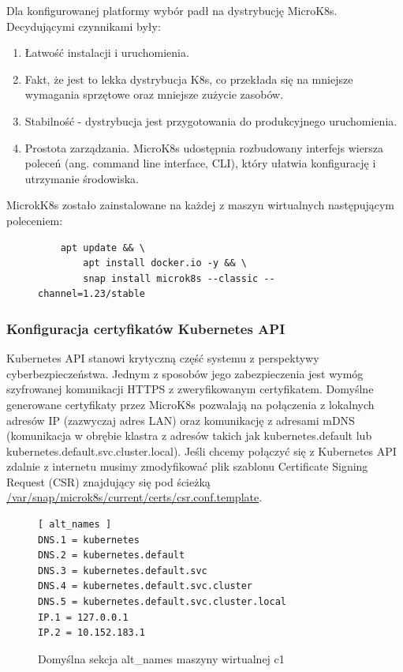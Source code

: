 \begin{samepage}
    Dla konfigurowanej platformy wybór padł na dystrybucję MicroK8s\cite{microk8s-docs-home}.
    Decydującymi czynnikami były:
    \begin{enumerate}
        \item Łatwość instalacji i uruchomienia.
        \item Fakt, że jest to lekka dystrybucja K8s, co przekłada się na mniejsze wymagania sprzętowe oraz mniejsze zużycie zasobów.
        \item Stabilność - dystrybucja jest przygotowania do produkcyjnego uruchomienia.
        \item Prostota zarządzania. MicroK8s udostępnia rozbudowany interfejs wiersza poleceń (ang. command line interface, CLI), który ułatwia konfigurację i utrzymanie środowiska.
    \end{enumerate}
\end{samepage}

MicrokK8s zostało zainstalowane na każdej z maszyn wirtualnych następującym poleceniem:
\begin{figure}[H]
    \begin{verbatim}
    apt update && \
        apt install docker.io -y && \
        snap install microk8s --classic --channel=1.23/stable
    \end{verbatim}
    \label{fig:install-microk8s}
\end{figure}

\subsubsection{Konfiguracja certyfikatów Kubernetes API}

Kubernetes API stanowi krytyczną część systemu z perspektywy cyberbezpieczeństwa.
Jednym z sposobów jego zabezpieczenia jest wymóg szyfrowanej komunikacji HTTPS z zweryfikowanym certyfikatem.
Domyślne generowane certyfikaty przez MicroK8s pozwalają na połączenia z lokalnych adresów IP (zazwyczaj adres LAN) oraz komunikację z adresami mDNS (komunikacja w obrębie klastra z adresów takich jak kubernetes.default lub kubernetes.default.svc.cluster.local).
Jeśli chcemy połączyć się z Kubernetes API zdalnie z internetu musimy zmodyfikować plik szablonu Certificate Signing Request (CSR) znajdujący się pod ścieżką \url{ /var/snap/microk8s/current/certs/csr.conf.template}.

\begin{figure}[H]
    \begin{verbatim}
[ alt_names ]
DNS.1 = kubernetes
DNS.2 = kubernetes.default
DNS.3 = kubernetes.default.svc
DNS.4 = kubernetes.default.svc.cluster
DNS.5 = kubernetes.default.svc.cluster.local
IP.1 = 127.0.0.1
IP.2 = 10.152.183.1
    \end{verbatim}
    \caption{Domyślna sekcja alt\_names maszyny wirtualnej c1}
    \label{fig:domyslna-konfiguracja-alt-names}
\end{figure}


